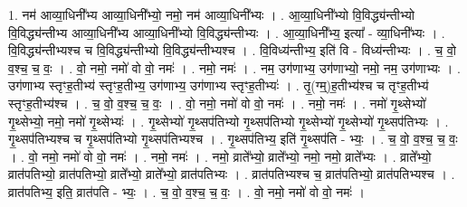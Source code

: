\documentclass[17pt]{extarticle}
\begin{document}
1. नम॑ आव्या॒धिनी᳚भ्य आव्या॒धिनी᳚भ्यो॒ नमो॒ नम॑ आव्या॒धिनी᳚भ्यः । . आ॒व्या॒धिनी᳚भ्यो वि॒विद्ध्य॑न्तीभ्यो वि॒विद्ध्य॑न्तीभ्य आव्या॒धिनी᳚भ्य आव्या॒धिनी᳚भ्यो वि॒विद्ध्य॑न्तीभ्यः । . आ॒व्या॒धिनी᳚भ्य॒ इत्या᳚ - व्या॒धिनी᳚भ्यः । . वि॒विद्ध्य॑न्तीभ्यश्च च वि॒विद्ध्य॑न्तीभ्यो वि॒विद्ध्य॑न्तीभ्यश्च । . वि॒विध्य॑न्तीभ्य॒ इति॑ वि - विध्य॑न्तीभ्यः । . च॒ वो॒ व॒श्च॒ च॒ वः॒ । . वो॒ नमो॒ नमो॑ वो वो॒ नमः॑ । . नमो॒ नमः॑ । . नम॒ उग॑णाभ्य॒ उग॑णाभ्यो॒ नमो॒ नम॒ उग॑णाभ्यः । . उग॑णाभ्य स्तृꣳह॒तीभ्य॑ स्तृꣳह॒तीभ्य॒ उग॑णाभ्य॒ उग॑णाभ्य स्तृꣳह॒तीभ्यः॑ । . तृ॒(ग्म्॒)ह॒तीभ्य॑श्च च तृꣳह॒तीभ्य॑ स्तृꣳह॒तीभ्य॑श्च । . च॒ वो॒ व॒श्च॒ च॒ वः॒ । . वो॒ नमो॒ नमो॑ वो वो॒ नमः॑ । . नमो॒ नमः॑ । . नमो॑ गृ॒थ्सेभ्यो॑ गृ॒थ्सेभ्यो॒ नमो॒ नमो॑ गृ॒थ्सेभ्यः॑ । . गृ॒थ्सेभ्यो॑ गृ॒थ्सप॑तिभ्यो गृ॒थ्सप॑तिभ्यो गृ॒थ्सेभ्यो॑ गृ॒थ्सेभ्यो॑ गृ॒थ्सप॑तिभ्यः । . गृ॒थ्सप॑तिभ्यश्च च गृ॒थ्सप॑तिभ्यो गृ॒थ्सप॑तिभ्यश्च । . गृ॒थ्सप॑तिभ्य॒ इति॑ गृ॒थ्सप॑ति - भ्यः॒ । . च॒ वो॒ व॒श्च॒ च॒ वः॒ । . वो॒ नमो॒ नमो॑ वो वो॒ नमः॑ । . नमो॒ नमः॑ । . नमो॒ व्राते᳚भ्यो॒ व्राते᳚भ्यो॒ नमो॒ नमो॒ व्राते᳚भ्यः । . व्राते᳚भ्यो॒ व्रात॑पतिभ्यो॒ व्रात॑पतिभ्यो॒ व्राते᳚भ्यो॒ व्राते᳚भ्यो॒ व्रात॑पतिभ्यः । . व्रात॑पतिभ्यश्च च॒ व्रात॑पतिभ्यो॒ व्रात॑पतिभ्यश्च । . व्रात॑पतिभ्य॒ इति॒ व्रात॑पति - भ्यः॒ । . च॒ वो॒ व॒श्च॒ च॒ वः॒ । . वो॒ नमो॒ नमो॑ वो वो॒ नमः॑ । \newline
\end{document}
